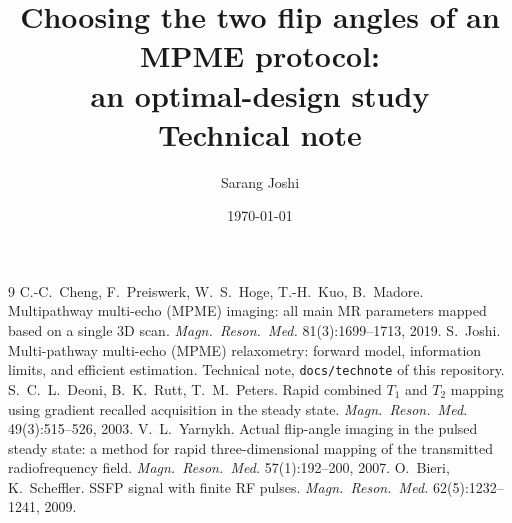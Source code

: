 \documentclass[11pt]{article}
\title{Choosing the two flip angles of an MPME protocol:\\
an optimal-design study\\[4pt]
\large Technical note}
\author{Sarang Joshi}
\date{\today}
\theoremstyle{definition}
\begin{document}
\maketitle










\appendix


\begin{thebibliography}{9}
 C.-C.~Cheng, F.~Preiswerk, W.~S.~Hoge, T.-H.~Kuo, B.~Madore.
  Multipathway multi-echo (MPME) imaging: all main MR parameters mapped based on a single
  3D scan. \emph{Magn.\ Reson.\ Med.} 81(3):1699--1713, 2019.
 S.~Joshi. Multi-pathway multi-echo (MPME) relaxometry: forward model,
  information limits, and efficient estimation. Technical note, \texttt{docs/technote} of this
  repository.
 S.~C.~L.~Deoni, B.~K.~Rutt, T.~M.~Peters. Rapid combined $T_1$ and $T_2$
  mapping using gradient recalled acquisition in the steady state. \emph{Magn.\ Reson.\ Med.}
  49(3):515--526, 2003.
 V.~L.~Yarnykh. Actual flip-angle imaging in the pulsed steady state: a
  method for rapid three-dimensional mapping of the transmitted radiofrequency field.
  \emph{Magn.\ Reson.\ Med.} 57(1):192--200, 2007.
 O.~Bieri, K.~Scheffler. SSFP signal with finite RF pulses.
  \emph{Magn.\ Reson.\ Med.} 62(5):1232--1241, 2009.
\end{thebibliography}
\end{document}
